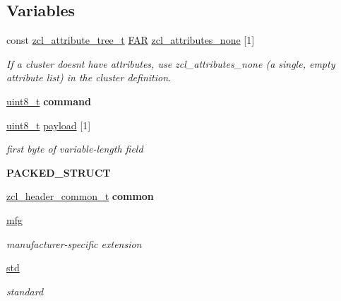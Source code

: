 \subsection*{Variables}
\begin{DoxyCompactItemize}
\item 
const \hyperlink{structzcl__attribute__tree__t}{zcl\+\_\+attribute\+\_\+tree\+\_\+t} \hyperlink{group__hal_gaef060b3456fdcc093a7210a762d5f2ed}{F\+AR} \hyperlink{group__zcl_gad1e7f7dd501a7ab02f6004e4091c6bea}{zcl\+\_\+attributes\+\_\+none} \mbox{[}1\mbox{]}
\begin{DoxyCompactList}\small\item\em If a cluster doesn\textquotesingle{}t have attributes, use zcl\+\_\+attributes\+\_\+none (a single, empty attribute list) in the cluster definition. \end{DoxyCompactList}\item 
\mbox{\label{group__zcl_ga1a5aaa930940857f68f245eeb89506b5}} 
\hyperlink{group__hal__dos_gae1affc9ca37cfb624959c866a73f83c2}{uint8\+\_\+t} {\bfseries command}
\item 
\mbox{\label{group__zcl_gacb1403989580c30b5cac60f347c5d6ab}} 
\hyperlink{group__hal__dos_gae1affc9ca37cfb624959c866a73f83c2}{uint8\+\_\+t} \hyperlink{group__zcl_gacb1403989580c30b5cac60f347c5d6ab}{payload} \mbox{[}1\mbox{]}
\begin{DoxyCompactList}\small\item\em first byte of variable-\/length field \end{DoxyCompactList}\item 
{\bfseries P\+A\+C\+K\+E\+D\+\_\+\+S\+T\+R\+U\+CT}
\item 
\hyperlink{group__zcl_gaece1b64b04ac629f83358d6d815451a5}{zcl\+\_\+header\+\_\+common\+\_\+t} {\bfseries common}
\item 
\hyperlink{group__zcl_gacef7f7e36d411b8000d1ac172c5e8782}{mfg}
\begin{DoxyCompactList}\small\item\em manufacturer-\/specific extension \end{DoxyCompactList}\item 
\hyperlink{group__zcl_ga36fda9bc88c532ecc94200bcd756b1d3}{std}
\begin{DoxyCompactList}\small\item\em standard \end{DoxyCompactList}\item 

\end{DoxyCompactItemize}
